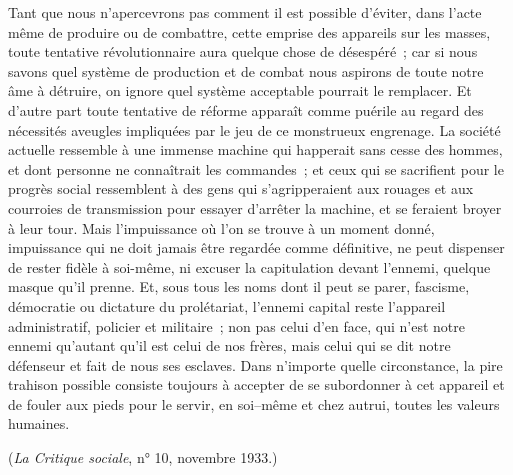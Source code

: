 \documentclass[french,twoside]{book} %
\begin{document}
Tant que nous n'apercevrons pas comment il est possible d'éviter, dans l'acte même de produire ou de combattre, cette emprise des appareils sur les masses, toute tentative révolutionnaire aura quelque chose de désespéré ; car si nous savons quel système de production et de combat nous aspirons de toute notre âme à détruire, on ignore quel système acceptable pourrait le remplacer. Et d'autre part toute tentative de réforme apparaît comme puérile au regard des nécessités aveugles impliquées par le jeu de ce monstrueux engrenage. La société actuelle ressemble à une immense machine qui happe­rait sans cesse des hommes, et dont personne ne connaîtrait les commandes ; et ceux qui se sacrifient pour le progrès social ressemblent à des gens qui s'agripperaient aux rouages et aux courroies de transmission pour essayer d'arrêter la machine, et se feraient broyer à leur tour. Mais l'impuissance où l'on se trouve à un moment donné, impuissance qui ne doit jamais être regardée comme définitive, ne peut dispenser de rester fidèle à soi-même, ni excuser la capitulation devant l'ennemi, quelque masque qu'il prenne. Et, sous tous les noms dont il peut se parer, fascisme, démocratie ou dictature du prolétariat, l'ennemi capital reste l'appareil administratif, policier et militaire ; non pas celui d'en face, qui n'est notre ennemi qu'autant qu'il est celui de nos frères, mais celui qui se dit notre défenseur et fait de nous ses esclaves. Dans n'importe quelle circonstance, la pire trahison possible consiste toujours à accepter de se subordonner à cet appareil et de fouler aux pieds pour le servir, en soi--même et chez autrui, toutes les valeurs humaines.\par
({\itshape La Critique sociale}, n° 10, novembre 1933.)\par
\end{document}
